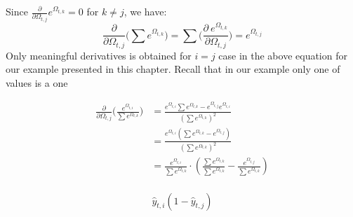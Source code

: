 \documentclass{article}
\begin{document}
Since $\frac{\partial }{\partial \Omega_{t,j}}e^{\Omega_{t,k}}=0$ for $k \neq j$, we have:
$$
\frac{\partial}{\partial \Omega_{t,j}}\bigg( \sum e^{\Omega_{t,k}} \bigg) =\sum \bigg( \frac{\partial ~e^{\Omega_{t,k}}}{\partial \Omega_{t,j}} \bigg) =e^{\Omega_{t,j}}
$$
Only meaningful derivatives is obtained for $i=j$  case in the above equation for our example presented in this chapter. Recall that in our example only one of  values is a one




\begin{align*}
\frac{\partial }{\partial \Omega_{t,j}} \bigg( \frac{e^{\Omega_{t,i}}}{\sum e^{\Omega_{t,k}}} \bigg) &=\frac{e^{\Omega_{t,i}} \sum e^{\Omega_{t,k}}-e^{\Omega_{t,j}} e^{\Omega_{t,i}}}{\left(\sum e^{\Omega_{t,k}}\right)^{2}} \\
& =\frac{e^{\Omega_{t,i}}\left(\sum e^{\Omega_{t,k}}-e^{\Omega_{t,j}}\right)}{\left(\sum e^{\Omega_{t,k}}\right)^{2}} \\
& =\frac{e^{\Omega_{t,i}}}{\sum e^{\Omega_{t,k}}} \cdot\left(\frac{\sum e^{\Omega_{t,k}}}{\sum e^{\Omega_{t,k}}}-\frac{e^{\Omega_{t,j}}}{\sum e^{\Omega_{t,k}}}\right) \\
\end{align*}

\begin{equation}
\label{eqn:partial_softmax}
    \hat{y}_{t,i}\left(1-\hat{y}_{t,j}\right)
\end{equation}
\end{document}
